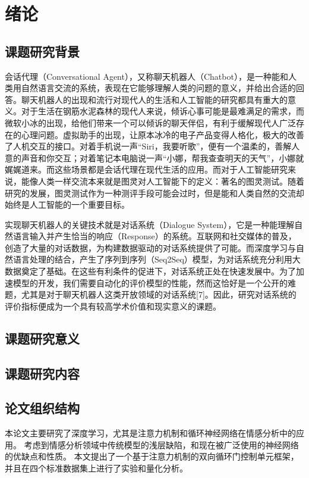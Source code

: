 
\chapter{绪论}\label{ch:绪论}

\section{课题研究背景}
会话代理（Conversational Agent），又称聊天机器人（Chatbot），是一种能和人类用自然语言交流的系统，表现在它能够理解人类的问题的意义，并给出合适的回答。聊天机器人的出现和流行对现代人的生活和人工智能的研究都具有重大的意义。对于生活在钢筋水泥森林的现代人来说，倾诉心事可能是最难满足的需求，而微软小冰的出现，给他们带来一个可以倾诉的聊天伴侣，有利于缓解现代人广泛存在的心理问题。虚拟助手的出现，让原本冰冷的电子产品变得人格化，极大的改善了人机交互的接口。对着手机说一声“Siri，我要听歌”，便有一个温柔的，善解人意的声音和你交互；对着笔记本电脑说一声“小娜，帮我查查明天的天气”，小娜就娓娓道来。而这些场景都是会话代理在现代生活的应用。而对于人工智能研究来说，能像人类一样交流本来就是图灵对人工智能下的定义：著名的图灵测试。随着研究的发展，图灵测试作为一种测评手段可能会过时，但是能和人类自然的交流却始终是人工智能的一个重要目标。

实现聊天机器人的关键技术就是对话系统（Dialogue System），它是一种能理解自然语言输入并产生恰当的响应（Response）的系统。互联网和社交媒体的普及，创造了大量的对话数据，为构建数据驱动的对话系统提供了可能。而深度学习与自然语言处理的结合，产生了序列到序列（Seq2Seq）模型，为对话系统充分利用大数据奠定了基础。在这些有利条件的促进下，对话系统正处在快速发展中。为了加速模型的开发，我们需要自动化的评价模型的性能，然而这恰好是一个公开的难题，尤其是对于聊天机器人这类开放领域的对话系统[7]。因此，研究对话系统的评价指标便成为一个具有较高学术价值和现实意义的课题。

\section{课题研究意义}


\section{课题研究内容}


\section{论文组织结构}
本论文主要研究了深度学习，尤其是注意力机制和循环神经网络在情感分析中的应用。
考虑到情感分析领域中传统模型的浅层缺陷，和现在被广泛使用的神经网络的优缺点和性质。
本文提出了一个基于注意力机制的双向循环门控制单元框架，并且在四个标准数据集上进行了实验和量化分析。

